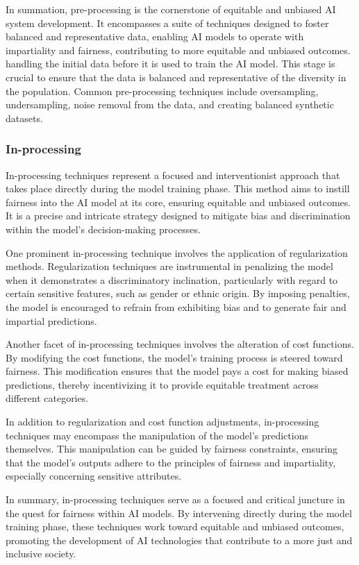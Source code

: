 \documentclass[12pt,a4paper,openright,twoside]{book}
\begin{document}
In summation, pre-processing is the cornerstone of equitable and unbiased AI system development. It encompasses a suite of techniques designed to foster balanced and representative data, enabling AI models to operate with impartiality and fairness, contributing to more equitable and unbiased outcomes. handling the initial data before it is used to train the AI model. This stage is crucial to ensure that the data is balanced and representative of the diversity in the population. Common pre-processing techniques include oversampling, undersampling, noise removal from the data, and creating balanced synthetic datasets.

\subsubsection{In-processing}

In-processing techniques represent a focused and interventionist approach that takes place directly during the model training phase. This method aims to instill fairness into the AI model at its core, ensuring equitable and unbiased outcomes. It is a precise and intricate strategy designed to mitigate bias and discrimination within the model's decision-making processes. 

One prominent in-processing technique involves the application of regularization methods. Regularization techniques are instrumental in penalizing the model when it demonstrates a discriminatory inclination, particularly with regard to certain sensitive features, such as gender or ethnic origin. By imposing penalties, the model is encouraged to refrain from exhibiting bias and to generate fair and impartial predictions. 

Another facet of in-processing techniques involves the alteration of cost functions. By modifying the cost functions, the model's training process is steered toward fairness. This modification ensures that the model pays a cost for making biased predictions, thereby incentivizing it to provide equitable treatment across different categories. 

In addition to regularization and cost function adjustments, in-processing techniques may encompass the manipulation of the model's predictions themselves. This manipulation can be guided by fairness constraints, ensuring that the model's outputs adhere to the principles of fairness and impartiality, especially concerning sensitive attributes. 

In summary, in-processing techniques serve as a focused and critical juncture in the quest for fairness within AI models. By intervening directly during the model training phase, these techniques work toward equitable and unbiased outcomes, promoting the development of AI technologies that contribute to a more just and inclusive society.
\end{document}
